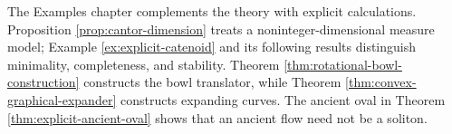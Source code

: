 \begin{remark}
The Examples chapter complements the theory with explicit calculations. Proposition \ref{prop:cantor-dimension} treats a noninteger-dimensional measure model; Example \ref{ex:explicit-catenoid} and its following results distinguish minimality, completeness, and stability. Theorem \ref{thm:rotational-bowl-construction} constructs the bowl translator, while Theorem \ref{thm:convex-graphical-expander} constructs expanding curves. The ancient oval in Theorem \ref{thm:explicit-ancient-oval} shows that an ancient flow need not be a soliton.
\end{remark}
